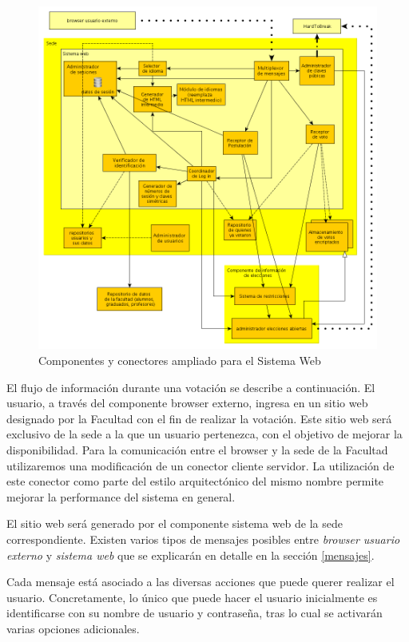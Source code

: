 \begin{figure}[H]
	\begin{center}
		\includegraphics[scale=0.5]{../informe/imagenes/sistema_web.png}
	\end{center} 
	\caption{Componentes y conectores ampliado para el Sistema Web}	
	\label{fig:sistemaWeb}
\end{figure}


El flujo de información durante una votación se describe a continuación. El usuario, a través del componente browser externo, ingresa en un sitio web designado por la Facultad con el fin de realizar la votación.  Este sitio web será exclusivo de la sede a la que un usuario pertenezca, con el objetivo de mejorar la disponibilidad. Para la comunicación entre el browser y la sede de la Facultad utilizaremos una modificación de un conector cliente servidor. La utilización de este conector como parte del estilo arquitectónico del mismo nombre permite mejorar la performance del sistema en general.

El sitio web será generado por el componente sistema web de la sede correspondiente. Existen varios tipos de mensajes posibles entre \emph{browser usuario externo} y \emph{sistema web} que se explicarán en detalle en la sección \ref{mensajes}. 

Cada mensaje está asociado a las diversas acciones que puede querer realizar el usuario. Concretamente, lo único que puede hacer el usuario inicialmente es identificarse con su nombre de usuario y contraseña, tras lo cual se activarán varias opciones adicionales.


